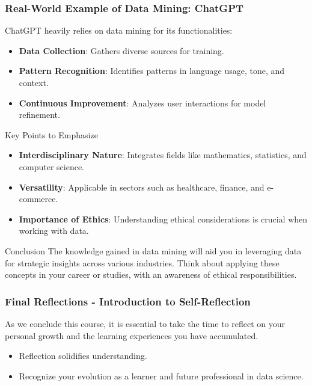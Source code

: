 \documentclass[aspectratio=169]{beamer}
\begin{document}
\begin{frame}[fragile]
    \frametitle{Real-World Example of Data Mining: ChatGPT}
    ChatGPT heavily relies on data mining for its functionalities:
    \begin{itemize}
        \item \textbf{Data Collection}: Gathers diverse sources for training.
        \item \textbf{Pattern Recognition}: Identifies patterns in language usage, tone, and context.
        \item \textbf{Continuous Improvement}: Analyzes user interactions for model refinement.
    \end{itemize}

    \begin{block}{Key Points to Emphasize}
        \begin{itemize}
            \item \textbf{Interdisciplinary Nature}: Integrates fields like mathematics, statistics, and computer science.
            \item \textbf{Versatility}: Applicable in sectors such as healthcare, finance, and e-commerce.
            \item \textbf{Importance of Ethics}: Understanding ethical considerations is crucial when working with data.
        \end{itemize}
    \end{block}
    
    \begin{block}{Conclusion}
        The knowledge gained in data mining will aid you in leveraging data for strategic insights across various industries. Think about applying these concepts in your career or studies, with an awareness of ethical responsibilities.
    \end{block}
\end{frame}

\begin{frame}[fragile]
    \frametitle{Final Reflections - Introduction to Self-Reflection}
    As we conclude this course, it is essential to take the time to reflect on your personal growth and the learning experiences you have accumulated. 
    \begin{itemize}
        \item Reflection solidifies understanding.
        \item Recognize your evolution as a learner and future professional in data science.
    \end{itemize}
\end{frame}
\end{document}
